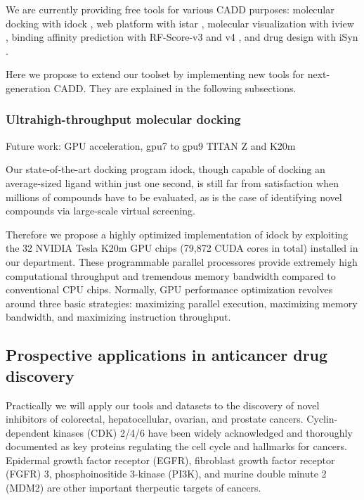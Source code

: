 \documentclass[a4paper,12pt]{article}
\begin{document}
We are currently providing free tools for various CADD purposes: molecular docking with idock \citep{1153}, web platform with istar \citep{1362}, molecular visualization with iview \citep{1366,1265}, binding affinity prediction with RF-Score-v3 and v4 \citep{1432,1647,1434,1663}, and drug design with iSyn \citep{1409,1387}.

Here we propose to extend our toolset by implementing new tools for next-generation CADD. They are explained in the following subsections.

\subsubsection*{Ultrahigh-throughput molecular docking}

Future work: GPU acceleration, gpu7 to gpu9 TITAN Z and K20m

Our state-of-the-art docking program idock, though capable of docking an average-sized ligand within just one second, is still far from satisfaction when millions of compounds have to be evaluated, as is the case of identifying novel compounds via large-scale virtual screening.

Therefore we propose a highly optimized implementation of idock by exploiting the 32 NVIDIA Tesla K20m GPU chips (79,872 CUDA cores in total) installed in our department. These programmable parallel processores provide extremely high computational throughput and tremendous memory bandwidth compared to conventional CPU chips. Normally, GPU performance optimization revolves around three basic strategies: maximizing parallel execution, maximizing memory bandwidth, and maximizing instruction throughput.

\subsection*{Prospective applications in anticancer drug discovery}


Practically we will apply our tools and datasets to the discovery of novel inhibitors of colorectal, hepatocellular, ovarian, and prostate cancers. Cyclin-dependent kinases (CDK) 2/4/6 have been widely acknowledged and thoroughly documented as key proteins regulating the cell cycle and hallmarks for cancers. Epidermal growth factor receptor (EGFR), fibroblast growth factor receptor (FGFR) 3, phosphoinositide 3-kinase (PI3K), and murine double minute 2 (MDM2) are other important therpeutic targets of cancers.
\end{document}
